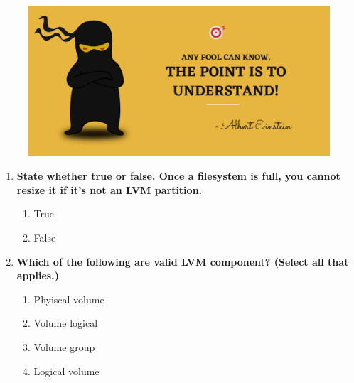 \setlength{\columnsep}{3pt}
\begin{flushleft}
	
	\paragraph{}
	\bigskip
	
	\begin{figure}[h!]
		\centering
		\includegraphics[scale=.2]{content/practise.jpg}
	\end{figure}	
	\begin{enumerate}
		
		\item \textbf{State whether true or false. Once a filesystem is full, you cannot resize it if it's not an LVM partition.}
		\begin{enumerate}[label=(\alph*)]
			\item True %
			\item False
		\end{enumerate}
	
		\bigskip
		\bigskip	
		\item \textbf{Which of the following are valid LVM component? (Select all that applies.)}
		\begin{enumerate}[label=(\alph*)]
			\item Phyiscal volume  %
			\item Volume logical  
			\item Volume group   %
			\item Logical volume %
		\end{enumerate}
		\bigskip
		\bigskip	
		

\end{enumerate}
\end{flushleft}
